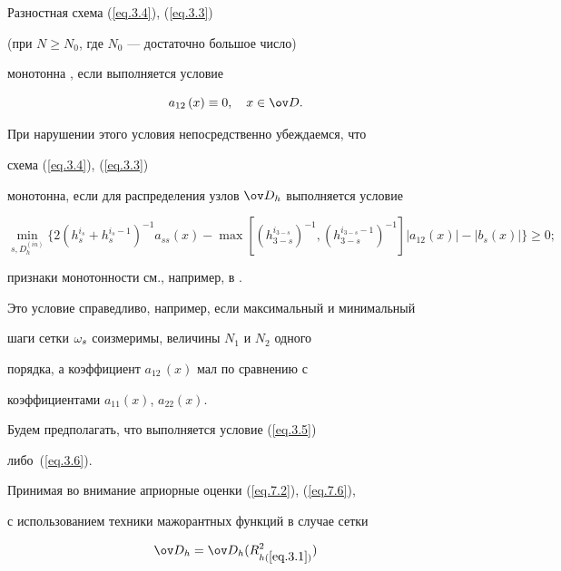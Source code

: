 Разностная схема (\ref{eq.3.4}), (\ref{eq.3.3})


(при $N\geq N_0$, где $N_0$ --- достаточно большое число)


монотонна \cite{8}, если выполняется условие


\begin{equation}


\label{eq.3.5}


a_{12}\,(x)\equiv 0,\quad x\in\od.


\end{equation}


При нарушении этого условия непосредственно убеждаемся, что


схема (\ref{eq.3.4}), (\ref{eq.3.3})


монотонна, если для распределения узлов $\od_h$ выполняется условие


\begin{equation}


\label{eq.3.6}


\min_{s,D_h^{(in)}}\{2(h_s^{i_s}+h_s^{i_s-1})^{-1}a_{ss}(x)-


\max[(h_{3-s}^{i_{3-s}})^{-1},(h_{3-s}^{i_{3-s}-1})^{-1}]


|a_{12}(x)|-|b_s(x)|\}\geq 0;


\end{equation}


признаки монотонности см., например, в \cite{8}.


Это условие справедливо, например, если максимальный и минимальный


шаги сетки $\omega_s$ соизмеримы, величины $N_1$ и $N_2$ одного


порядка, а коэффициент $a_{12}\,(x)$ мал по сравнению с


коэффициентами $a_{11}(x)$, $a_{22}(x)$.





Будем предполагать, что выполняется условие (\ref{eq.3.5})


либо~(\ref{eq.3.6}).





Принимая во внимание априорные оценки (\ref{eq.7.2}), (\ref{eq.7.6}),


с использованием техники мажорантных функций в случае сетки


\begin{equation}\label{eq.3.7}


\od_h=\od_h(R^2_{h(\ref{eq.3.1})})


\end{equation}


